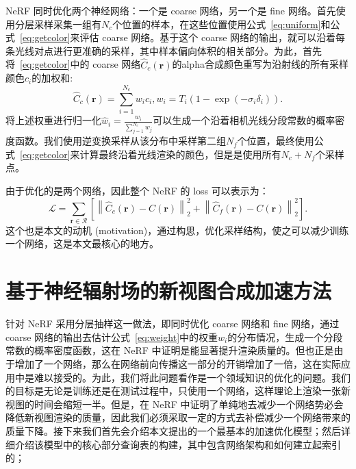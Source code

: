 NeRF 同时优化两个神经网络：一个是 coarse 网络，另一个是 fine 网络。首先使用分层采样采集一组有$N_c$个位置的样本，在这些位置使用公式~\ref{eq:uniform}和公式~\ref{eq:getcolor}来评估 coarse 网络。基于这个 coarse 网络的输出，就可以沿着每条光线对点进行更准确的采样，其中样本偏向体积的相关部分。为此，首先将~\ref{eq:getcolor}中的 coarse 网络$\displaystyle \hat{C}_{c} \left(\symbf{r}\right)$的alpha合成颜色重写为沿射线的所有采样颜色$\displaystyle c_i$的加权和:
\begin{equation}
    \hat{C}_{c}\left(\symbf{r}\right) = \sum_{i=1}^{N_c}w_{i}c_{i}, w_{i} = T_{i}\left(1 - \exp \left(-\sigma_{i}\delta_{i}\right)\right).
    \label{eq:weight}
\end{equation}
将上述权重进行归一化$\displaystyle \hat{w}_{i} = \frac{w_i}{\sum_{j=1}^{N_c}w_j}$可以生成一个沿着相机光线分段常数的概率密度函数。我们使用逆变换采样从该分布中采样第二组$\displaystyle N_f$个位置，最终使用公式~\ref{eq:getcolor}来计算最终沿着光线渲染的颜色，但是是使用所有$\displaystyle N_c + N_f$个采样点。

由于优化的是两个网络，因此整个 NeRF 的 loss 可以表示为：
\begin{equation}
    \mathcal{L} = \sum_{\symbf{r}\in \mathcal{R}}\left[\left\|\hat{C}_{c}\left(\symbf{r}\right) - C\left(\symbf{r}\right)\right\|_{2}^{2} + \left\|\hat{C}_{f}\left(\symbf{r}\right) - C\left(\symbf{r}\right)\right\|_{2}^{2} \right].
    \label{eq:nerf_loss}
\end{equation}
这个也是本文的动机 (motivation)，通过构思，优化采样结构，使之可以减少训练一个网络，这是本文最核心的地方。

\section{基于神经辐射场的新视图合成加速方法}\label{method}
针对 NeRF 采用分层抽样这一做法，即同时优化 coarse 网络和 fine 网络，通过 coarse 网络的输出去估计公式~\ref{eq:weight}中的权重$\displaystyle w_i$的分布情况，生成一个分段常数的概率密度函数，这在 NeRF 中证明是能显著提升渲染质量的。但也正是由于增加了一个网络，那么在网络前向传播这一部分的开销增加了一倍，这在实际应用中是难以接受的。为此，我们将此问题看作是一个领域知识的优化的问题。我们的目标是无论是训练还是在测试过程中，只使用一个网络，这样理论上渲染一张新视图的时间会缩短一半。但是，在 NeRF 中证明了单纯地去减少一个网络势必会降低新视图渲染的质量，因此我们必须采取一定的方式去补偿减少一个网络带来的质量下降。接下来我们首先会介绍本文提出的一个最基本的加速优化模型；然后详细介绍该模型中的核心部分查询表的构建，其中包含网络架构和如何建立起索引的；

